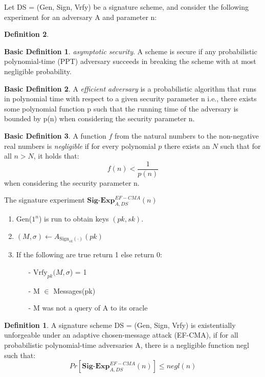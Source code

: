 \documentclass[]{final_report}
\theoremstyle{definition}
\newtheorem{definition}{Definition}[chapter]
\newtheorem{basic}{Basic Definition}
\begin{document}
Let DS = (Gen, Sign, Vrfy) be a signature scheme, and consider the following experiment for an adversary A and parameter n:
\begin{definition}
\label{def:EF-CMA}

\begin{basic}
\textit{asymptotic security}. A scheme is secure if any probabilistic polynomial-time (PPT) adversary succeeds in breaking the scheme with at most negligible probability.
\end{basic}
\begin{basic}
A \textit{efficient adversary} is a probabilistic algorithm that runs in polynomial time with respect to a given security parameter n i.e., there exists some polynomial function p such that the running time of the adversary is bounded by p(n) when considering the security parameter n.
\end{basic}
\begin{basic}
A function \( f \) from the natural numbers to the non-negative real numbers is \textit{negligible} if for every polynomial \( p \) there exists an \( N \) such that for all \( n > N \), it holds that:
\[ f(n) < \frac{1}{p(n)} \] when considering the security parameter n.
\end{basic}



The signature experiment $\textbf{Sig-Exp}_{A,DS}^{EF-CMA}(n)$
\begin{enumerate}
    \item Gen($1^n$) is run to obtain keys $(pk, sk)$.
    \item \((M, \sigma) \leftarrow A_{\text{Sign}_{sk}(\cdot)}(pk)\)
    \item If the following are true return 1 else return 0: 
    \begin{itemize}
    \item [-] $\text{Vrfy}_{pk} (M, \sigma$) = 1
    \item [-] M $\in$ Messages(pk)
    \item [-] M was not a query of A to its oracle
   \end{itemize}
\end{enumerate}

\begin{definition}
A signature scheme DS = (Gen, Sign, Vrfy) is existentially unforgeable under an adaptive chosen-message attack (EF-CMA), if for all probabilistic polynomial-time adversaries A, there is a negligible function negl such that:
\[ Pr[\textbf{Sig-Exp}_{A,DS}^{EF-CMA}(n)] \leq negl(n) \]

\end{definition}

\end{definition}
\end{document}
